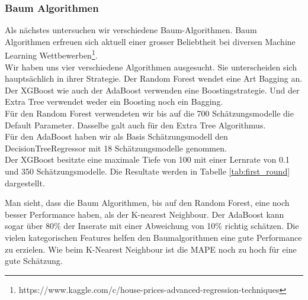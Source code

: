 \subsubsection{Baum Algorithmen}
Als nächstes untersuchen wir verschiedene Baum-Algorithmen. Baum Algorithmen erfreuen sich aktuell einer grosser Beliebtheit bei diversen Machine Learning Wettbewerben\footnote{https://www.kaggle.com/c/house-prices-advanced-regression-techniques}.\\[2ex]
%
Wir haben uns vier verschiedene Algorithmen ausgesucht. Sie unterscheiden sich hauptsächlich in ihrer Strategie. Der Random Forest wendet eine Art Bagging an. Der XGBoost wie auch der AdaBoost verwenden eine Boostingstrategie. Und der Extra Tree verwendet weder ein Boosting noch ein Bagging.\\
Für den Random Forest verwendeten wir bis auf die 700 Schätzungsmodelle die Default Parameter. Dasselbe galt auch für den Extra Tree Algorithmus.\\
Für den AdaBoost haben wir als Basis Schätzungsmodell den DecisionTreeRegressor mit 18 Schätzungsmodelle genommen.\\
Der XGBoost besitzte eine maximale Tiefe von 100 mit einer Lernrate von 0.1 und 350 Schätzungsmodelle.
Die Resultate werden in Tabelle \ref{tab:first_round} dargestellt.\\[2ex]
%
\begin{table}[ht]
\centering
{}
\caption{Ergebnisse der Baum Algorithmen}
\label{tab:first_round}
\end{table}
%
Man sieht, dass die Baum Algorithmen, bis auf den Random Forest, eine noch besser Performance haben, als der K-nearest Neighbour. Der AdaBoost kann sogar über 80\% der Inserate mit einer Abweichung von 10\% richtig schätzen. Die vielen kategorischen Features helfen den Baumalgorithmen eine gute Performance zu erzielen. Wie beim K-Nearest Neighbour ist die MAPE noch zu hoch für eine gute Schätzung.\\[2ex]
